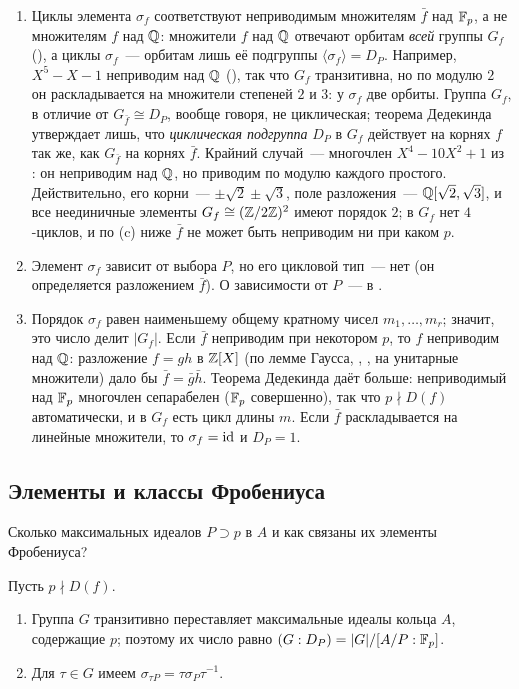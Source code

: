 \begin{remark}[4.28a]
\begin{enumerate}[label=(\alph*),leftmargin=*]
\item Циклы элемента $\sigma_f$ соответствуют неприводимым множителям $\bar f$ над $\mathbb F_p$, а не множителям $f$ над $\mathbb Q$:
множители $f$ над $\mathbb Q$ отвечают орбитам \emph{всей} группы $G_f$ (), а циклы $\sigma_f$~--- орбитам лишь её подгруппы
$\langle\sigma_f\rangle=D_P$. Например, $X^5-X-1$ неприводим над $\mathbb Q$ (), так что $G_f$ транзитивна, но по модулю $2$
он раскладывается на множители степеней $2$ и $3$: у $\sigma_f$ две орбиты. Группа $G_f$, в отличие от
$G_{\bar f}\cong D_P$, вообще говоря, не циклическая; теорема Дедекинда утверждает лишь, что \emph{циклическая
подгруппа} $D_P$ в $G_f$ действует на корнях $f$ так же, как $G_{\bar f}$ на корнях $\bar f$. Крайний случай~---
многочлен $X^4-10X^2+1$ из : он неприводим над $\mathbb Q$, но приводим по модулю каждого простого. Действительно, его
корни~--- $\pm\sqrt2\pm\sqrt3$, поле разложения~--- $\mathbb Q[\sqrt2,\sqrt3]$, и все неединичные элементы
$G_f\cong(\mathbb Z/2\mathbb Z)^2$ имеют порядок $2$; в $G_f$ нет $4$-циклов, и по (c) ниже $\bar f$ не может быть неприводим ни при
каком $p$.
\item Элемент $\sigma_f$ зависит от выбора $P$, но его цикловой тип~--- нет (он определяется разложением $\bar f$). О
зависимости от $P$~--- в .
\item Порядок $\sigma_f$ равен наименьшему общему кратному чисел $m_1,\dots,m_r$; значит, это число делит $|G_f|$. Если
$\bar f$ неприводим при некотором $p$, то $f$ неприводим над $\mathbb Q$: разложение $f=gh$ в $\mathbb Z[X]$ (по лемме Гаусса, , ,
на унитарные множители) дало бы $\bar f=\bar g\bar h$. Теорема Дедекинда даёт больше: неприводимый над $\mathbb F_p$
многочлен сепарабелен ($\mathbb F_p$ совершенно), так что $p\nmid D(f)$ автоматически, и в $G_f$ есть цикл длины $m$. Если $\bar f$ раскладывается на линейные множители, то $\sigma_f=\operatorname{id}$ и $D_P=1$.
\end{enumerate}
\end{remark}

\subsection*{Элементы и классы Фробениуса}

Сколько максимальных идеалов $P\supset p$ в $A$ и как связаны их элементы Фробениуса?

\begin{proposition}[4.28b]
Пусть $p\nmid D(f)$.
\begin{enumerate}[label=\textup{(\alph*)}]
\item Группа $G$ транзитивно переставляет максимальные идеалы кольца $A$, содержащие $p$; поэтому их число равно
$(G:D_P)=|G|/[A/P:\mathbb F_p]$.
\item Для $\tau\in G$ имеем $\sigma_{\tau P}=\tau\sigma_P\tau^{-1}$.
\end{enumerate}
\end{proposition}

